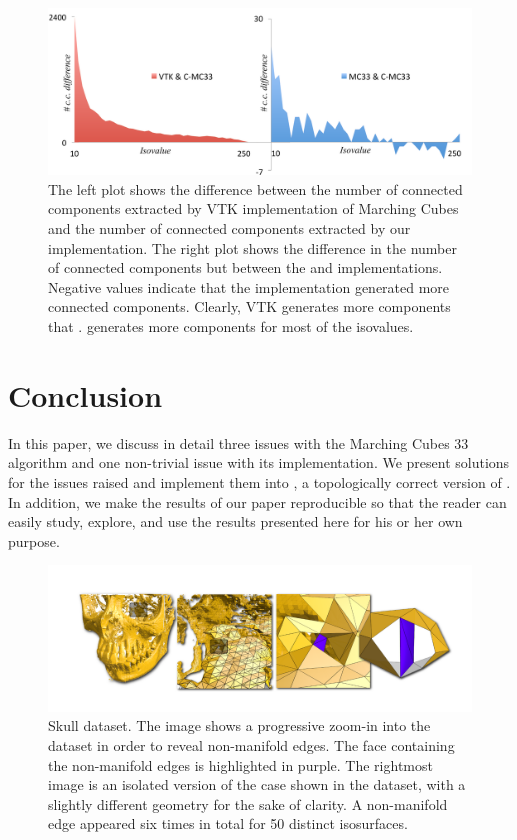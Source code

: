 \begin{figure}
       \includegraphics[width=1\linewidth]{chapter4/figures/aneurism_cc_vtk.pdf}
       \caption{\label{fig:cc} The left plot shows the difference between the number of connected components extracted by VTK implementation of Marching Cubes and the number of connected components extracted by our \cmc{} implementation. The right plot shows the difference in the number of connected components but between the \mc{} and  \cmc{} implementations. Negative values indicate that the \cmc{} implementation generated more connected components.
Clearly, VTK generates more components that \cmc{}. \mc{} generates more components for most of the isovalues. }
\end{figure}


\section{Conclusion}
\label{conclusion}

In this paper, we discuss in detail three issues with  the Marching Cubes 33 algorithm and one non-trivial issue with its implementation. 
We present solutions for the issues raised and implement them into \cmc, a topologically correct version of \mc. In addition, we make the results of our paper reproducible so that the reader can easily study, explore, and use the results presented here for his or her own purpose. 


\begin{figure}
     \centering
     \includegraphics[width=0.9\linewidth]{chapter4/figures/skull.png}
     \caption{Skull dataset. The image shows a progressive zoom-in into the dataset in order to reveal non-manifold edges. The face containing the non-manifold edges is highlighted  in purple. The rightmost image is an isolated version of the case shown in the dataset, with a slightly different geometry for the sake of clarity. A non-manifold edge appeared six times in total for 50 distinct isosurfaces.}
     \label{fig:non-manifold-real-data}
\end{figure}

